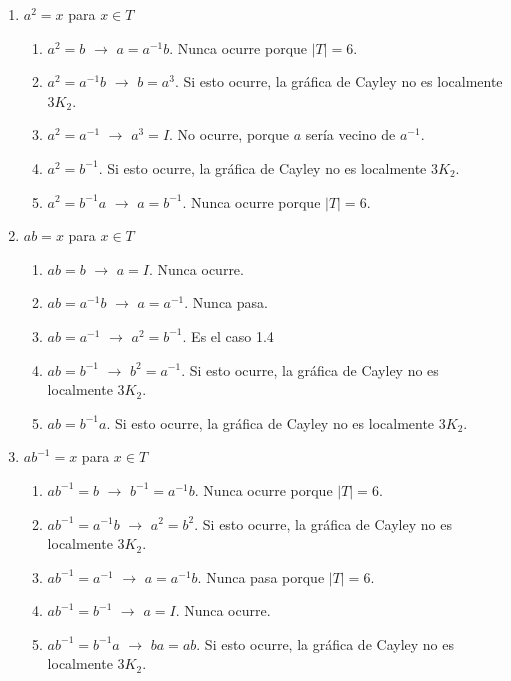 \documentclass[12pt]{book}
\theoremstyle{definition}
\begin{document}
\begin{enumerate}

\item $a^{2}=x$ para $x\in T$
  \begin{enumerate}
  \item $a^2=b$ $\rightarrow$ $a=a^{-1}b$. Nunca ocurre porque
    $|T|=6$.
  \item $a^2=a^{-1}b$ $\rightarrow$ $b=a^3$. Si esto ocurre, la
    gráfica de Cayley no es localmente $3K_2$.
  \item $a^2=a^{-1}$ $\rightarrow$ $a^3=I$. No ocurre, porque $a$
    sería vecino de $a^{-1}$.
  \item $a^2=b^{-1}$.  Si esto ocurre, la gráfica de Cayley no es
    localmente $3K_2$.
  \item $a^2=b^{-1}a$ $\rightarrow$ $a=b^{-1}$. Nunca ocurre porque
    $|T|=6$.

  \end{enumerate}

\item $ab=x$ para $x\in T$
  \begin{enumerate}
  \item $ab=b$ $\rightarrow$ $a=I$. Nunca ocurre.
  \item $ab=a^{-1}b$ $\rightarrow$ $a=a^{-1}$. Nunca pasa.
  \item $ab=a^{-1}$ $\rightarrow$ $a^2=b^{-1}$. Es el caso 1.4
  \item $ab=b^{-1}$ $\rightarrow$ $b^2=a^{-1}$. Si esto ocurre, la
    gráfica de Cayley no es localmente $3K_2$.
  \item $ab=b^{-1}a$. Si esto ocurre, la gráfica de Cayley no es
    localmente $3K_2$.
  \end{enumerate}

\item $ab^{-1}=x$ para $x\in T$
  \begin{enumerate}
  \item $ab^{-1}=b$ $\rightarrow$ $b^{-1}=a^{-1}b$. Nunca ocurre
    porque $|T|=6$.
  \item $ab^{-1}=a^{-1}b$ $\rightarrow$ $a^2=b^2$. Si esto ocurre, la
    gráfica de Cayley no es localmente $3K_2$.
  \item $ab^{-1}=a^{-1}$ $\rightarrow$ $a=a^{-1}b$. Nunca pasa porque
    $|T|=6$.
  \item $ab^{-1}=b^{-1}$ $\rightarrow$ $a=I$. Nunca ocurre.
  \item $ab^{-1}=b^{-1}a$ $\rightarrow$ $ba=ab$. Si esto ocurre, la
    gráfica de Cayley no es localmente $3K_2$.
  \end{enumerate}


\end{enumerate}
\end{document}
